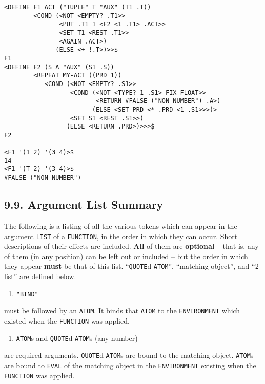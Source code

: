 \documentclass[a4paper,]{article}
\providecommand{\tightlist}{%
  \setlength{\itemsep}{0pt}\setlength{\parskip}{0pt}}
\begin{document}
\begin{verbatim}
<DEFINE F1 ACT ("TUPLE" T "AUX" (T1 .T))
        <COND (<NOT <EMPTY? .T1>>
               <PUT .T1 1 <F2 <1 .T1> .ACT>>
               <SET T1 <REST .T1>>
               <AGAIN .ACT>)
              (ELSE <+ !.T>)>>$
F1
<DEFINE F2 (S A "AUX" (S1 .S))
        <REPEAT MY-ACT ((PRD 1))
           <COND (<NOT <EMPTY? .S1>>
                  <COND (<NOT <TYPE? 1 .S1> FIX FLOAT>>
                         <RETURN #FALSE ("NON-NUMBER") .A>)
                        (ELSE <SET PRD <* .PRD <1 .S1>>>)>
                  <SET S1 <REST .S1>>)
                 (ELSE <RETURN .PRD>)>>>$
F2

<F1 '(1 2) '(3 4)>$
14
<F1 '(T 2) '(3 4)>$
#FALSE ("NON-NUMBER")
\end{verbatim}

\subsection{9.9. Argument List Summary}\label{argument-list-summary}

The following is a listing of all the various tokens which can appear in the argument \texttt{LIST} of a \texttt{FUNCTION},
in the order in which they can occur. Short descriptions of their effects are included. \textbf{All} of them are
\textbf{optional} -- that is, any of them (in any position) can be left out or included -- but the order in which they
appear \textbf{must} be that of this list. ``\texttt{QUOTE}d \texttt{ATOM}'', ``matching object'', and ``2-list'' are
defined below.

\begin{enumerate}
\def\labelenumi{(\arabic{enumi})}
\tightlist
\item
  \texttt{"BIND"} 
\end{enumerate}

must be followed by an \texttt{ATOM}. It binds that \texttt{ATOM} to the \texttt{ENVIRONMENT} which existed when the
\texttt{FUNCTION} was applied.

\begin{enumerate}
\def\labelenumi{(\arabic{enumi})}
\setcounter{enumi}{1}
\tightlist
\item
  \texttt{ATOM}s and \texttt{QUOTE}d \texttt{ATOM}s (any number)
\end{enumerate}

are required arguments. \texttt{QUOTE}d \texttt{ATOM}s are bound to the matching object. \texttt{ATOM}s are bound to
\texttt{EVAL} of the matching object in the \texttt{ENVIRONMENT} existing when the \texttt{FUNCTION} was applied.
\end{document}
